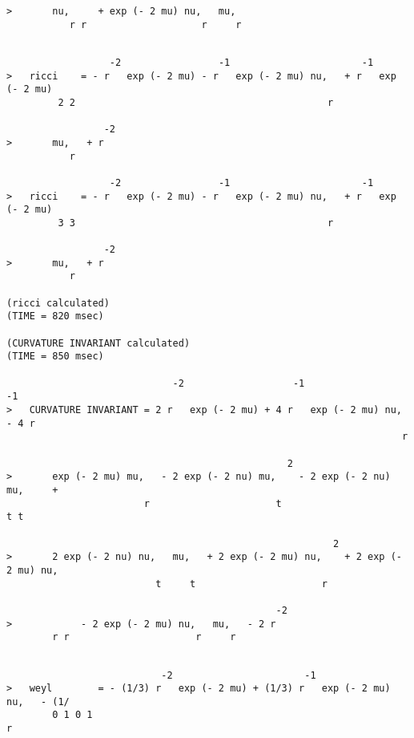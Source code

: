 {\samepage
\begin{verbatim}
>       nu,     + exp (- 2 mu) nu,   mu,
           r r                    r     r
\end{verbatim}
       }
\begin{verbatim}

                  -2                 -1                       -1
>   ricci    = - r   exp (- 2 mu) - r   exp (- 2 mu) nu,   + r   exp (- 2 mu)
         2 2                                            r

                 -2
>       mu,   + r
           r

                  -2                 -1                       -1
>   ricci    = - r   exp (- 2 mu) - r   exp (- 2 mu) nu,   + r   exp (- 2 mu)
         3 3                                            r

                 -2
>       mu,   + r
           r

(ricci calculated)
(TIME = 820 msec)

(CURVATURE INVARIANT calculated)
(TIME = 850 msec)

                             -2                   -1                         -1
>   CURVATURE INVARIANT = 2 r   exp (- 2 mu) + 4 r   exp (- 2 mu) nu,   - 4 r
                                                                     r

                                                 2
>       exp (- 2 mu) mu,   - 2 exp (- 2 nu) mu,    - 2 exp (- 2 nu) mu,     +
                        r                      t                       t t

                                                         2
>       2 exp (- 2 nu) nu,   mu,   + 2 exp (- 2 mu) nu,    + 2 exp (- 2 mu) nu,
                          t     t                      r

                                               -2
>            - 2 exp (- 2 mu) nu,   mu,   - 2 r
        r r                      r     r


\end{verbatim}
{\samepage
\begin{verbatim}
                           -2                       -1
>   weyl        = - (1/3) r   exp (- 2 mu) + (1/3) r   exp (- 2 mu) nu,   - (1/
        0 1 0 1                                                        r
\end{verbatim}
          }
